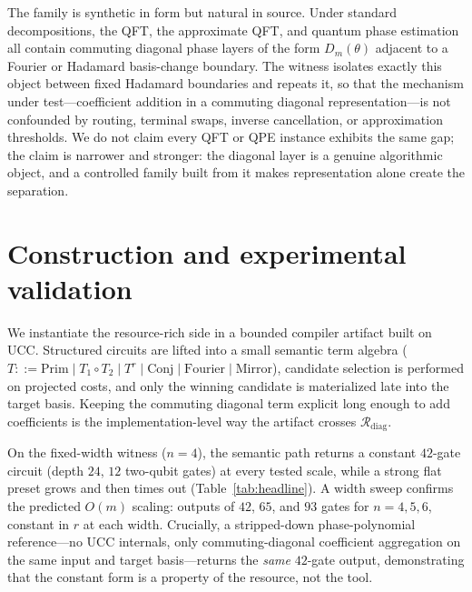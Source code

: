 \documentclass[11pt]{article}
\begin{document}
The family is synthetic in form but natural in source. Under standard decompositions, the QFT, the
approximate QFT, and quantum phase estimation all contain commuting diagonal phase layers of the
form $D_m(\theta)$ adjacent to a Fourier or Hadamard basis-change boundary. The witness isolates
exactly this object between fixed Hadamard boundaries and repeats it, so that the mechanism under
test---coefficient addition in a commuting diagonal representation---is not confounded by routing,
terminal swaps, inverse cancellation, or approximation thresholds. We do not claim every QFT or QPE
instance exhibits the same gap; the claim is narrower and stronger: the diagonal layer is a genuine
algorithmic object, and a controlled family built from it makes representation alone create the
separation.

\section*{Construction and experimental validation}

We instantiate the resource-rich side in a bounded compiler artifact built on UCC. Structured
circuits are lifted into a small semantic term algebra
($T ::= \mathrm{Prim} \mid T_1\!\circ\! T_2 \mid T^r \mid \mathrm{Conj} \mid \mathrm{Fourier} \mid
\mathrm{Mirror}$), candidate selection is performed on projected costs, and only the winning
candidate is materialized late into the target basis. Keeping the commuting diagonal term explicit
long enough to add coefficients is the implementation-level way the artifact crosses
$\mathcal{R}_{\mathrm{diag}}$.

On the fixed-width witness ($n=4$), the semantic path returns a constant $42$-gate circuit (depth
$24$, $12$ two-qubit gates) at every tested scale, while a strong flat preset grows and then times
out (Table~\ref{tab:headline}). A width sweep confirms the predicted $O(m)$ scaling: outputs of
$42$, $65$, and $93$ gates for $n=4,5,6$, constant in $r$ at each width. Crucially, a stripped-down
phase-polynomial reference---no UCC internals, only commuting-diagonal coefficient aggregation on
the same input and target basis---returns the \emph{same} $42$-gate output, demonstrating that the
constant form is a property of the resource, not the tool.
\end{document}
